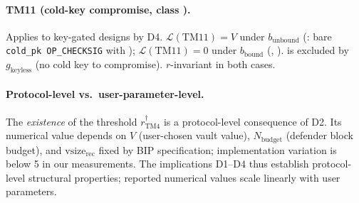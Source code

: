 \paragraph{TM11 (cold-key compromise, class \classcold{}).}\label{sec:sens:tm11}
Applies to key-gated designs by D4.
$\mathcal{L}(\mathrm{TM11}) = V$ under $b_{\text{unbound}}$
(\catcsfs{}: bare \texttt{cold\_pk OP\_CHECKSIG} with
);
$\mathcal{L}(\mathrm{TM11}) = 0$ under $b_{\text{bound}}$ (\opctv{},
\opvault{}). \opccv{} is excluded by $g_{\text{keyless}}$ (no cold key
to compromise). $r$-invariant in both cases.

\paragraph{Protocol-level vs.\ user-parameter-level.}
The \emph{existence} of the threshold $r^\dagger_{\mathrm{TM4}}$
is a protocol-level consequence of D2. Its numerical value depends
on $V$ (user-chosen vault value), $N_{\text{budget}}$ (defender
block budget), and $\text{vsize}_{\text{rec}}$ fixed by BIP
specification; implementation variation is below 5\vB{} in our
measurements. The implications D1--D4 thus establish
protocol-level structural properties; reported numerical values
scale linearly with user parameters.

